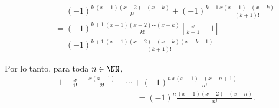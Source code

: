 \begin{examplebox}{}{}
\begin{enumerate}[label=\roman*., topsep=6pt, itemsep=0pt]
\begin{align*}
            & \qquad = (-1)^k \frac{(x - 1)(x - 2) \cdots (x - k)}{k!} + (-1)^{k + 1} \frac{x(x - 1) \cdots (x - k)}{(k + 1)!} \\
            & \qquad = (-1)^{k + 1} \frac{(x - 1)(x - 2) \cdots (x - k)}{k!} \left[ \frac{x}{k + 1} - 1 \right] \\
            & \qquad = (-1)^{k + 1} \frac{(x - 1)(x - 2) \cdots (x - k)(x - k - 1)}{(k + 1)!}
        \end{align*}
    \end{enumerate}
    Por lo tanto, para toda $n \in \NN$,
    \begin{align*}
        & 1 - \frac{x}{1!} + \frac{x(x - 1)}{2!} - \cdots + (-1)^n \frac{x(x - 1) \cdots (x - n + 1)}{n!} \\
        & \hspace{4cm} = (-1)^n \frac{(x - 1)(x - 2) \cdots (x - n)}{n!}.
    \end{align*}
\end{examplebox}

\newpage

